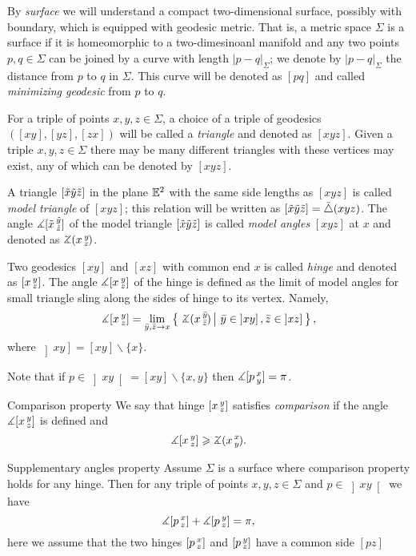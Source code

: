 \documentclass[oneside,a4paper, 12pt]{article}
\begin{document}
By \emph{surface} we will understand a compact two-dimensional surface, possibly with boundary, which is equipped with geodesic metric.
That is, a metric space $\Sigma$ is a surface if it is homeomorphic to a two-dimesinoanl manifold 
and any two points $p,q\in \Sigma$ can be joined by a curve with length $|p-q|_\Sigma$;
we denote by $|p-q|_\Sigma$ the distance from $p$ to $q$ in $\Sigma$.
This curve will be denoted as $[pq]$ and called \emph{minimizing geodesic} from $p$ to $q$.

For a triple of points $x,y,z\in\Sigma$, a choice of a triple of geodesics $([x y], [y z], [z x])$ will be called a \emph{triangle} 
and denoted as 
$[x y z]$.
Given a triple $x,y,z\in \Sigma$ there may be many different triangles with these vertices may exist, any of which can be denoted by $[x y z]$.

A triangle $[\~x\~y\~z]$ in the plane $\EE^2$
with the same side lengths as $[x y z]$ 
is called \emph{model triangle} of $[x y z]$;
this relation will be written as $[\~x\~y\~z]=\~\triangle(x y z)$.
The angle $\mangle\hinge{\~x}{\~y}{\~z}$ of the model triangle $[\~x\~y\~z]$ is called \emph{model angles} $[x y z]$ at $x$ and denoted as $\angk x y z$.


Two geodesics $[xy]$ and $[xz]$ with common end $x$ is called \emph{hinge} and denoted as $\hinge{x}{y}{z}$.
The angle $\mangle\hinge{x}{y}{z}$ of the hinge is defined as the limit of model angles for small triangle sling along the sides of hinge to its vertex. Namely,
\[\mangle\hinge{x}{y}{z}=\lim_{\bar y,\bar z\to x}\set{\angk{x}{\bar y}{\bar z}}{ \bar y\in \left]xy\right], \bar z\in \left]xz\right]},\]
where $\left]xy\right]=[xy]\backslash\{x\}$.

Note that if $p\in \left]xy\right[=[xy]\backslash\{x,y\}$ then $\mangle\hinge{p}{x}{y}=\pi$.

\begin{thm}{Comparison property}\label{Comparison property}
We say that hinge $\hinge x y z$ 
satisfies \emph{comparison} if the angle
$\mangle\hinge{x}{y}{z}$ is defined and 
\[\mangle \hinge{x}{y}{z} \ge \angk{x}{x}{y}{}{}.\]
\end{thm}

\begin{thm}{Supplementary angles property}\label{Supplementary angles property}
Assume $\Sigma$ is a surface where comparison property holds for any hinge.
Then for any triple of points $x,y,z\in \Sigma$ and $p\in \left]xy\right[$ we have
\[\mangle\hinge{p}{x}{z}+\mangle\hinge{p}{y}{z}=\pi,\]
here we assume that the two hinges $\hinge{p}{x}{z}$ and $\hinge{p}{y}{z}$ have a common side $[pz]$
\end{thm}
\end{document}
